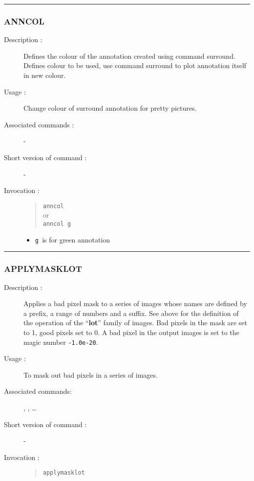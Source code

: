\hrule
\subsubsection*{\label{ANNCOL}ANNCOL}

\begin{description}

\item[Description :] Defines the colour of the annotation created using
command surround.  Defines colour to be used, use command surround to plot
annotation itself in new colour.

\item[Usage :] Change colour of surround annotation for pretty pictures.
\item[Associated commands :] -
\item[Short version of command :] -
\item[Invocation :]

\begin{quote}{\tt anncol }\\
or \\
{\tt anncol g }
\end{quote}

\begin{itemize}

\item {\tt g }\/is for green annotation

\end{itemize}

\end{description}

\hrule
\subsubsection*{\label{APPLYMASKLOT}APPLYMASKLOT}

\begin{description}

\item[Description :] Applies a bad pixel mask to a series of images whose
names are defined by a prefix, a range of numbers and a suffix.  See above
for the definition of the operation of the ``{\bf lot}'' family of images. Bad
pixels in the mask are set to 1, good pixels set to 0.  A bad pixel in the
output images is set to the magic number {\tt -1.0e-20}.

\item[Usage :] To mask out bad pixels in a series of images.
\item[Associated commands:] {\tt {}},
{\tt {}}, \ldots
\item[Short version of command :] -
\item[Invocation :]

\begin{quote}{\tt  applymasklot }\end{quote}

\end{description}

